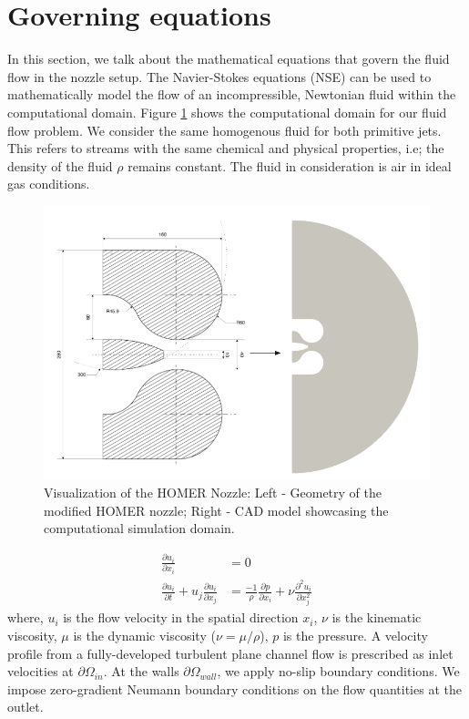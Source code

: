 \section{Governing equations} \label{goveq}
In this section, we talk about the mathematical equations that govern the fluid flow in the nozzle setup. The Navier-Stokes equations (NSE) can be used to mathematically model the flow of an incompressible, Newtonian fluid within the computational domain. Figure \ref{fig:Domain} shows the computational domain for our fluid flow problem. We consider the same homogenous fluid for both primitive jets. This refers to streams with the same chemical and physical properties, i.e; the density of the fluid $\rho$ remains constant. The fluid in consideration is air in ideal gas conditions. 
\begin{figure}[ht]
  \centering
  \includegraphics[width=12cm]{images/Theory-CFD/Flow Domain.png}
  \caption{Visualization of the HOMER Nozzle: Left - Geometry of the modified HOMER nozzle; Right - CAD model showcasing the computational simulation domain.}
  \label{fig:Domain}
\end{figure}
\begin{equation}
  \begin{aligned}
  \frac{\partial u_i}{\partial x_i}&=0\\
  \frac{\partial u_i}{\partial t}+u_j \frac{\partial u_i}{\partial x_j}&=\frac{-1}{\rho} \frac{\partial p}{\partial x_i}+\nu \frac{\partial^2 u_i}{\partial x_j^2}
  \end{aligned}
  \end{equation}
where, $u_i$ is the flow velocity in the spatial direction $x_i$, $\nu$ is the kinematic viscosity, $\mu$ is the dynamic viscosity ($\nu = \mu / \rho$), $p$ is the pressure. A velocity profile from a fully-developed turbulent plane channel flow is prescribed as inlet velocities at $\partial{\Omega_{in}}$. At the walls $\partial{\Omega_{wall}}$, we apply no-slip boundary conditions. We impose zero-gradient Neumann boundary conditions on the flow quantities at the outlet.\\
